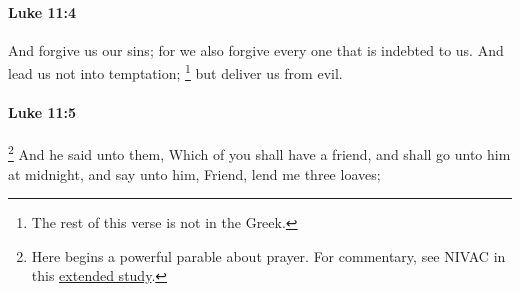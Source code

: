 		\paragraph{Luke 11:4} %
			\label{LUKE-11-4}

			And forgive us our sins; for we also forgive every one that is indebted to us. And lead us not into temptation;
			\footnote{%
				The rest of this verse is not in the Greek.
				}%
			but deliver us from evil.

			\begin{framed}
			\scriptsize
				\begin{compactdesc}
					\item[SBLG] 
				\end{compactdesc}
			\end{framed}

		\paragraph{Luke 11:5} %
			\label{LUKE-11-5}

				\footnote{%
					Here begins a powerful parable about prayer. For commentary, see NIVAC in this \hyperref[EXSS-NT-LUKE-8-PRAYER]{extended study}.
					}%
			And he said unto them, Which of you shall have a friend, and shall go unto him at midnight, and say unto him, Friend, lend me three loaves;

